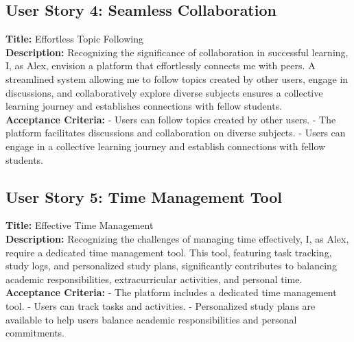 \subsection{User Story 4: Seamless Collaboration}

\textbf{Title:} Effortless Topic Following \\
\textbf{Description:} Recognizing the significance of collaboration in successful learning, I, as Alex, envision a platform that effortlessly connects me with peers. A streamlined system allowing me to follow topics created by other users, engage in discussions, and collaboratively explore diverse subjects ensures a collective learning journey and establishes connections with fellow students. \\
\textbf{Acceptance Criteria:} 
- Users can follow topics created by other users.
- The platform facilitates discussions and collaboration on diverse subjects.
- Users can engage in a collective learning journey and establish connections with fellow students.

\subsection{User Story 5: Time Management Tool}

\textbf{Title:} Effective Time Management \\
\textbf{Description:} Recognizing the challenges of managing time effectively, I, as Alex, require a dedicated time management tool. This tool, featuring task tracking, study logs, and personalized study plans, significantly contributes to balancing academic responsibilities, extracurricular activities, and personal time. \\
\textbf{Acceptance Criteria:} 
- The platform includes a dedicated time management tool.
- Users can track tasks and activities.
- Personalized study plans are available to help users balance academic responsibilities and personal commitments.
